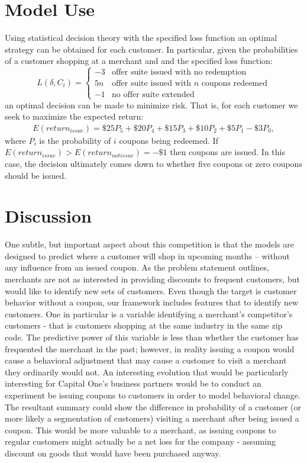 \documentclass[12pt]{article} %
\begin{document}
\section{Model Use}
Using statistical decision theory with the specified loss function an optimal strategy can be obtained for each customer.
In particular, given the probabilities of a customer shopping at a merchant and and the specified loss function:  
\[
L(\delta,C_i) = \left\{
\begin{array}{rl}
-3 & \mbox{offer suite issued with no redemption} \\
5n & \mbox{offer suite issued with }  n  \mbox{ coupons redeemed} \\
-1 & \mbox{no offer suite extended}
\end{array}
\right.
\] 
an optimal decision can be made to minimize risk.  That is, for each customer we seek to maximize the expected return:
\begin{eqnarray}
E(return_{issue}) = \$25 P_5 + \$20 P_4 + \$15 P_3 +\$10 P_2 +\$5 P_1 - \$3 P_0,
\end{eqnarray}
where $P_i$ is the probability of $i$ coupons being redeemed.  If $E(return_{issue}) > E(return_{notissue}) =-\$1$ then coupons are issued.  In this case, the decision ultimately comes down to whether five coupons or zero coupons should be issued.
\section{Discussion}
One subtle, but important aspect about this competition is that the models are designed to predict where a customer will shop in upcoming months -- without any influence from an issued coupon.  As the problem statement outlines, merchants are not as interested in providing discounts to frequent customers, but would like to identify new sets of customers.  Even though the target is customer behavior without a coupon, our framework includes features that to identify new customers.  One in particular is a variable identifying a merchant's competitor's customers - that is customers shopping at the same industry in the same zip code.  The predictive power of this variable is less than whether the customer has frequented the merchant in the past; however, in reality issuing a coupon would cause a behavioral adjustment that may cause a customer to visit a merchant they ordinarily would not.  An interesting evolution that would be particularly interesting for Capital One's business partners would be to conduct an experiment be issuing coupons to customers in order to model behavioral change.  The resultant summary could show the difference in probability of a customer (or more likely a segmentation of customers)  visiting a merchant after being issued a coupon.  This would be more valuable to a merchant, as issuing coupons to regular customers might actually be a net loss for the company - assuming discount on goods that would have been purchased anyway.  
\end{document}

